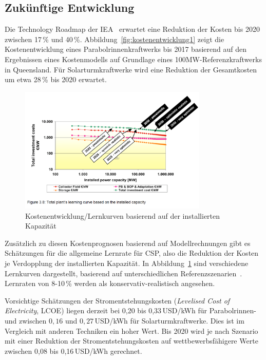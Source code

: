 \subsection*{Zukünftige Entwicklung}

Die Technology Roadmap der IEA~\cite{iea2010} erwartet eine Reduktion der Kosten bis 2020 zwischen 17\,\% und 40\,\%. Abbildung~\ref{fig:kostenentwicklung1} zeigt die Kostenentwicklung eines Parabolrinnenkraftwerks bis 2017 basierend auf den Ergebnissen eines Kostenmodells auf Grundlage eines 100MW-Referenzkraftwerks in Queensland.
Für Solarturmkraftwerke wird eine Reduktion der Gesamtkosten um etwa 28\,\% bis 2020 erwartet.

\begin{figure}[H]
	\centering
	\includegraphics[width=0.8\textwidth,trim=1 1 1 1,clip]{kostenentwicklung2.png}
	\caption{Kostenentwicklung/Lernkurven basierend auf der installierten Kapazität}
	\label{fig:kostenentwicklung2}
\end{figure}

Zusätzlich zu diesen Kostenprognosen basierend auf Modellrechnungen gibt es Schätzungen für die allgemeine Lernrate für CSP, also die Reduktion der Kosten je Verdopplung der installierten Kapazität. In Abbildung~\ref{fig:kostenentwicklung2} sind verschiedene Lernkurven dargestellt, basierend auf unterschiedlichen Referenzszenarien~\cite{viebahn2008}. Lernraten von 8-10\,\% werden als konservativ-realistisch angesehen.

Vorsichtige Schätzungen der Stromentstehungskosten (\emph{Levelised Cost of Electricity}, LCOE) liegen derzeit bei 0,20 bis 0,33\,USD/kWh für Parabolrinnen- und zwischen $0,16$ und $0,27$\,USD/kWh für Solarturmkraftwerke. Dies ist im Vergleich mit anderen Techniken ein hoher Wert. Bis 2020 wird je nach Szenario mit einer Reduktion der Stromentstehungskosten auf wettbewerbsfähigere Werte zwischen 0,08 bis 0,16\,USD/kWh gerechnet.\cite{irena2012}

